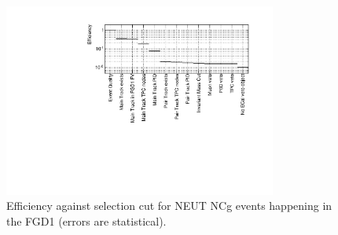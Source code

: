 \begin{figure}[ht]
  \center
  \includegraphics[width=0.8\textwidth]{images/NCg/eff_cut.pdf}
  \caption[NEUT FGD1 NC$\gamma$ efficiency against selection
  cut]{Efficiency against selection cut for \Gls{NEUT} \Gls{NCg}
    events happening in the \Gls{FGD}1 (errors are statistical).}
  \label{fig:effvscuts}
\end{figure}



